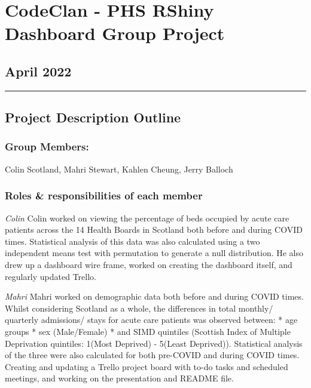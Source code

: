 \documentclass[
]{article}
\author{}
\date{\vspace{-2.5em}}
\begin{document}
\hypertarget{codeclan---phs-rshiny-dashboard-group-project}{%
\section{CodeClan - PHS RShiny Dashboard Group
Project}\label{codeclan---phs-rshiny-dashboard-group-project}}

\hypertarget{april-2022}{%
\subsection{April 2022}\label{april-2022}}

\begin{center}\rule{0.5\linewidth}{0.5pt}\end{center}

\hypertarget{project-description-outline}{%
\subsection{Project Description
Outline}\label{project-description-outline}}

\hypertarget{group-members}{%
\subsubsection{Group Members:}\label{group-members}}

Colin Scotland, Mahri Stewart, Kahlen Cheung, Jerry Balloch

\hypertarget{roles-responsibilities-of-each-member}{%
\subsubsection{Roles \& responsibilities of each
member}\label{roles-responsibilities-of-each-member}}

\emph{Colin} Colin worked on viewing the percentage of beds occupied by
acute care patients across the 14 Health Boards in Scotland both before
and during COVID times. Statistical analysis of this data was also
calculated using a two independent means test with permutation to
generate a null distribution. He also drew up a dashboard wire frame,
worked on creating the dashboard itself, and regularly updated Trello.

\emph{Mahri} Mahri worked on demographic data both before and during
COVID times. Whilst considering Scotland as a whole, the differences in
total monthly/ quarterly admissions/ stays for acute care patients was
observed between: * age groups * sex (Male/Female) * and SIMD quintiles
(Scottish Index of Multiple Deprivation quintiles: 1(Most Deprived) -
5(Least Deprived)). Statistical analysis of the three were also
calculated for both pre-COVID and during COVID times. Creating and
updating a Trello project board with to-do tasks and scheduled meetings,
and working on the presentation and README file.
\end{document}

